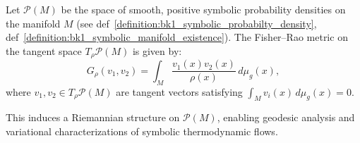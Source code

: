 \begin{definition}
\label{definition:bk1_symbolic_information_geometry}
Let $\mathcal{P}(M)$ be the space of smooth, positive symbolic probability densities on the manifold $M$ (see def~\ref{definition:bk1_symbolic_probabilty_density}, def~\ref{definition:bk1_symbolic_manifold_existence}). The Fisher–Rao metric on the tangent space $T_{\rho} \mathcal{P}(M)$ is given by:
\[
G_{\rho}(v_1, v_2) = \int_M \frac{v_1(x) v_2(x)}{\rho(x)} \, d\mu_g(x),
\]
where $v_1, v_2 \in T_\rho \mathcal{P}(M)$ are tangent vectors satisfying $\int_M v_i(x) \, d\mu_g(x) = 0$.

This induces a Riemannian structure on $\mathcal{P}(M)$, enabling geodesic analysis and variational characterizations of symbolic thermodynamic flows.
\end{definition}
